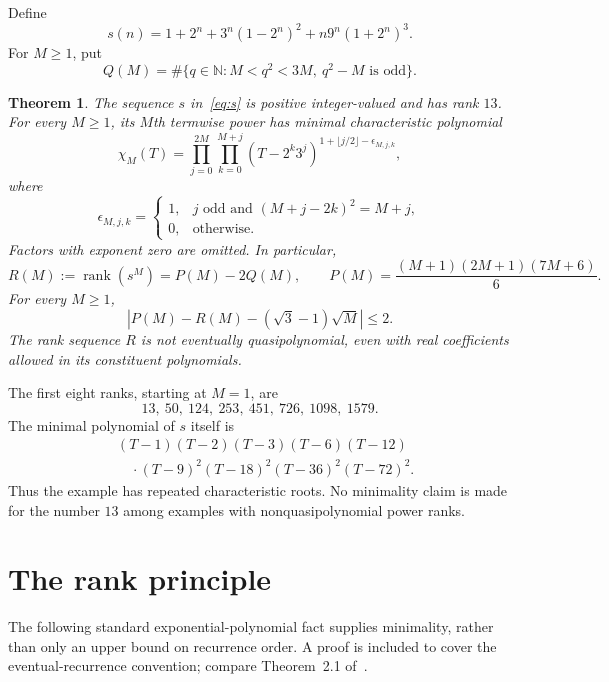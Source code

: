 \documentclass[11pt,a4paper]{article}
\newtheorem{theorem}{Theorem}
\newcommand{\rank}{\operatorname{rank}}
\newcommand{\NN}{\mathbb N}
\begin{document}
Define
\begin{equation}\label{eq:s}
 s(n)=1+2^n+3^n(1-2^n)^2+n9^n(1+2^n)^3.
\end{equation}
For $M\ge1$, put
\begin{equation}\label{eq:Q}
 Q(M)=\#\{q\in\NN:M<q^2<3M,\ q^2-M\text{ is odd}\}.
\end{equation}

\begin{theorem}\label{thm:main}
The sequence $s$ in~\eqref{eq:s} is positive integer-valued and has rank $13$.
For every $M\ge1$, its $M$th termwise power has minimal characteristic polynomial
\begin{equation}\label{eq:chi}
 \chi_M(T)=\prod_{j=0}^{2M}\prod_{k=0}^{M+j}
 (T-2^k3^j)^{1+\lfloor j/2\rfloor-\epsilon_{M,j,k}},
\end{equation}
where
\[
 \epsilon_{M,j,k}=
 \begin{cases}
 1,&j\text{ odd and }(M+j-2k)^2=M+j,\\
 0,&\text{otherwise}.
 \end{cases}
\]
Factors with exponent zero are omitted. In particular,
\begin{equation}\label{eq:rank}
 R(M):=\rank(s^M)=P(M)-2Q(M),\qquad
 P(M)=\frac{(M+1)(2M+1)(7M+6)}6.
\end{equation}
For every $M\ge1$,
\begin{equation}\label{eq:asymp}
 \left|P(M)-R(M)-(\sqrt3-1)\sqrt M\right|\le2.
\end{equation}
The rank sequence $R$ is not eventually quasipolynomial, even with real
coefficients allowed in its constituent polynomials.
\end{theorem}

The first eight ranks, starting at $M=1$, are
\[
 13,\ 50,\ 124,\ 253,\ 451,\ 726,\ 1098,\ 1579.
\]
The minimal polynomial of $s$ itself is
\begin{equation}\label{eq:initialchi}
 \begin{split}
 &(T-1)(T-2)(T-3)(T-6)(T-12)\\[-2pt]
 &\hspace{1em}\cdot(T-9)^2(T-18)^2(T-36)^2(T-72)^2.
 \end{split}
\end{equation}
Thus the example has repeated characteristic roots. No minimality claim is made
for the number $13$ among examples with nonquasipolynomial power ranks.

\section{The rank principle}
The following standard exponential-polynomial fact supplies minimality, rather
than only an upper bound on recurrence order. A proof is included to cover the
eventual-recurrence convention; compare Theorem~2.1 of~\cite{RowlandSistos}.
\end{document}
